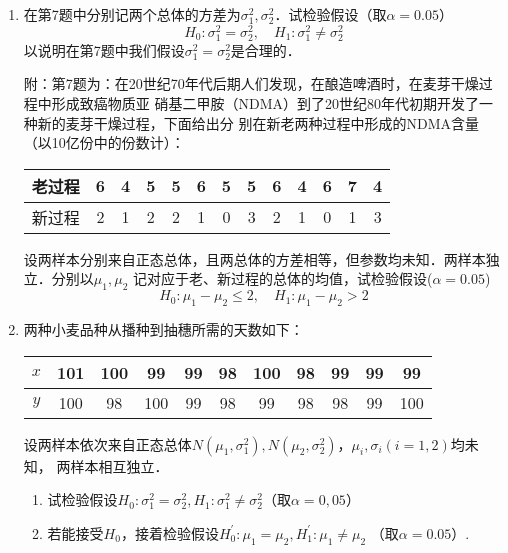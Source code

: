 \documentclass[10pt,a4paper]{article}
\begin{document}
\begin{enumerate}
    \item 在第7题中分别记两个总体的方差为$\sigma_1^2,\sigma_2^2$．试检验假设（取$\alpha=0.05$）
    $$H_0:\sigma_1^2=\sigma_2^2, \quad H_1:\sigma_1^2\neq \sigma^2_2$$
    以说明在第7题中我们假设$\sigma_1^2=\sigma_2^2$是合理的．
    
    {\kaishu 附：第7题为：在20世纪70年代后期人们发现，在酿造啤酒时，在麦芽干燥过程中形成致癌物质亚
    硝基二甲胺（NDMA）到了20世纪80年代初期开发了一种新的麦芽干燥过程，下面给出分
    别在新老两种过程中形成的NDMA含量（以10亿份中的份数计）：
    \renewcommand{\arraystretch}{1.3}
    \begin{table}[H]\centering
    \begin{tabular}{c|cccccccccccc}
    老过程 & 6 & 4 & 5 & 5 & 6 & 5 & 5 & 6 & 4 & 6 & 7 & 4 \\ \hline
    新过程 & 2 & 1 & 2 & 2 & 1 & 0 & 3 & 2 & 1 & 0 & 1 & 3
    \end{tabular}
    \end{table}
    \renewcommand{\arraystretch}{1.0}
    设两样本分别来自正态总体，且两总体的方差相等，但参数均未知．两样本独立．分别以$\mu_1,\mu_2$
    记对应于老、新过程的总体的均值，试检验假设($\alpha=0.05$)
    $$H_0:\mu_1-\mu_2\leq 2,\quad H_1:\mu_1-\mu_2>2$$}




    \item 两种小麦品种从播种到抽穗所需的天数如下：
    \renewcommand{\arraystretch}{1.3}   
    \begin{table}[H]\centering
        \begin{tabular}{c|cccccccccc}
        $x$ & 101 & 100 & 99  & 99 & 98 & 100 & 98 & 99 & 99 & 99  \\ \hline
        $y$ & 100 & 98  & 100 & 99 & 98 & 99  & 98 & 98 & 99 & 100
        \end{tabular}
    \end{table}
    \renewcommand{\arraystretch}{1.0}
    设两样本依次来自正态总体$N(\mu_1,\sigma_1^2),N(\mu_2,\sigma_2^2)$，$\mu_i,\sigma_i(i=1,2)$均未知，
    两样本相互独立．
    \begin{enumerate}
        \item 试检验假设$H_0:\sigma_1^2=\sigma_2^2,H_1:\sigma_1^2\neq \sigma_2^2$（取$\alpha=0,05$）
        \item 若能接受$H_0$，接着检验假设$H^\prime_0:\mu_1=\mu_2,H^\prime_1:\mu_1\neq \mu_2$ （取$\alpha=0.05$）.
    \end{enumerate}





\end{enumerate}
\end{document}
